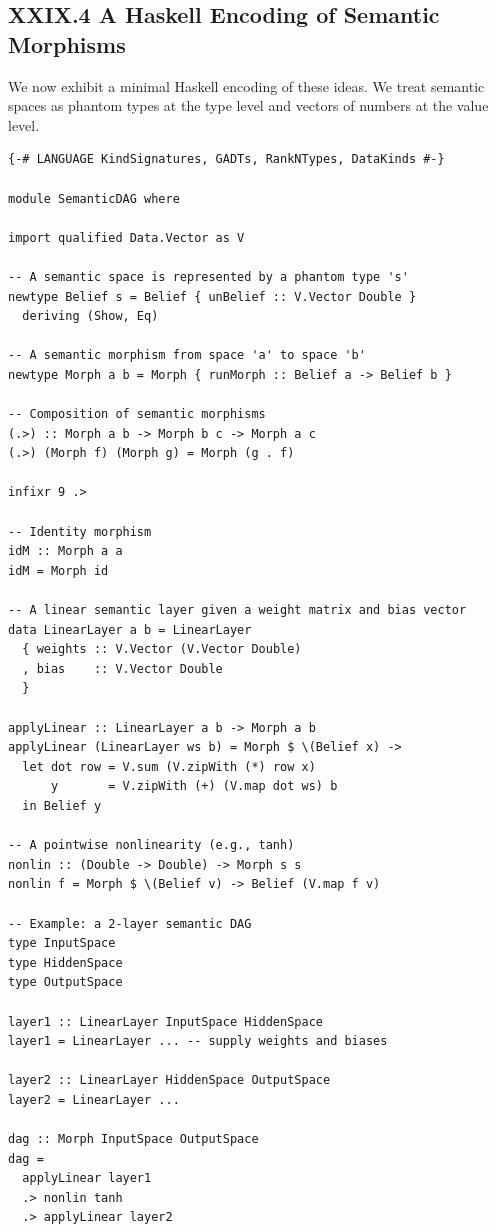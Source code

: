 \documentclass[12pt,letterpaper]{article}
\begin{document}
\subsection{XXIX.4 A Haskell Encoding of Semantic Morphisms}

We now exhibit a minimal Haskell encoding of these ideas. We treat semantic spaces as phantom types at the type level and vectors of numbers at the value level.

\begin{verbatim}
{-# LANGUAGE KindSignatures, GADTs, RankNTypes, DataKinds #-}

module SemanticDAG where

import qualified Data.Vector as V

-- A semantic space is represented by a phantom type 's'
newtype Belief s = Belief { unBelief :: V.Vector Double }
  deriving (Show, Eq)

-- A semantic morphism from space 'a' to space 'b'
newtype Morph a b = Morph { runMorph :: Belief a -> Belief b }

-- Composition of semantic morphisms
(.>) :: Morph a b -> Morph b c -> Morph a c
(.>) (Morph f) (Morph g) = Morph (g . f)

infixr 9 .>

-- Identity morphism
idM :: Morph a a
idM = Morph id

-- A linear semantic layer given a weight matrix and bias vector
data LinearLayer a b = LinearLayer
  { weights :: V.Vector (V.Vector Double)
  , bias    :: V.Vector Double
  }

applyLinear :: LinearLayer a b -> Morph a b
applyLinear (LinearLayer ws b) = Morph $ \(Belief x) ->
  let dot row = V.sum (V.zipWith (*) row x)
      y       = V.zipWith (+) (V.map dot ws) b
  in Belief y

-- A pointwise nonlinearity (e.g., tanh)
nonlin :: (Double -> Double) -> Morph s s
nonlin f = Morph $ \(Belief v) -> Belief (V.map f v)

-- Example: a 2-layer semantic DAG
type InputSpace
type HiddenSpace
type OutputSpace

layer1 :: LinearLayer InputSpace HiddenSpace
layer1 = LinearLayer ... -- supply weights and biases

layer2 :: LinearLayer HiddenSpace OutputSpace
layer2 = LinearLayer ...

dag :: Morph InputSpace OutputSpace
dag =
  applyLinear layer1
  .> nonlin tanh
  .> applyLinear layer2
\end{verbatim}
\end{document}
